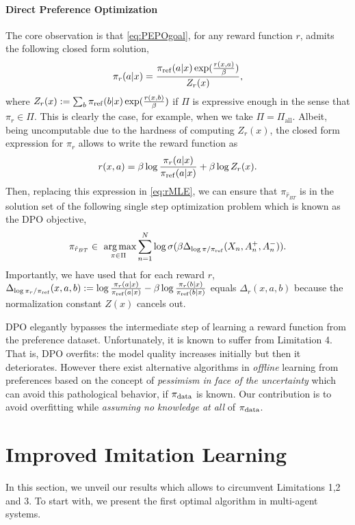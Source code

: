 \documentclass{article}
\begin{document}
\paragraph{Direct Preference Optimization}
The core observation is that \eqref{eq:PEPOgoal}, for any reward function $r$, admits the following closed form solution, 
\begin{equation}
\label{eq:Optimal-Policy}
\pi_r(a|x) = \frac{\pi_{\mathrm{ref}}(a|x) \exp(\frac{r(x,a)}{\beta})}{Z_r(x)},
\end{equation}
where $ Z_r(x) := \sum_{b} \pi_{\mathrm{ref}}(b|x) \exp(\frac{r(x,b)}{\beta})$ if $\Pi$ is expressive enough in the sense that $\pi_r \in \Pi$. This is clearly the case, for example, when we take $\Pi=\Pi_{\mathrm{all}}$. Albeit, being uncomputable due to the hardness of computing  $Z_r(x)$, the closed form expression for $\pi_r$ allows to write the reward function as \begin{equation}r(x,a) = \beta \log \frac{\pi_r(a|x)}{\pi_{\mathrm{ref}}(a|x)} + \beta \log Z_r(x) \label{eq:rfrompi}.\end{equation} Then, replacing this expression in \eqref{eq:rMLE}, we can ensure that $\pi_{\hat{r}_{BT}}$ is in the solution set of the following single step optimization problem which is known as the DPO objective,
\begin{equation}
\label{eq:DPO}
    \pi_{\hat{r}_{BT}} \in \mathop{\mbox{ arg\,max}}_{\pi \in \Pi} \sum^N_{n=1} \log \sigma (\beta \Delta_{\log \pi/\pi_{\mathrm{ref}}}(X_n, A^+_n, A^-_n)).
\end{equation}
Importantly, we have used that for each reward $r$,  $ \Delta_{\log \pi_r/\pi_{\mathrm{ref}}}(x,a,b) :=  \log \frac{\pi_r(a|x)}{\pi_{\mathrm{ref}}(a|x)} - \beta \log \frac{\pi_r(b|x)}{\pi_{\mathrm{ref}}(b|x)} $ equals $\Delta_r(x,a,b)$ because the normalization constant $Z(x)$ cancels out.

DPO elegantly bypasses the intermediate step of learning a reward function from the preference dataset. Unfortunately, it is known to suffer from Limitation 4. That is, DPO overfits: the model quality increases initially but then it deteriorates. However there exist alternative algorithms \citep{huang2024correcting,liu2024provably} in \emph{offline} learning from preferences based on the concept of \emph{pessimism in face of the uncertainty}  which can avoid this pathological behavior, if $\pi_{\mathrm{data}}$ is known.
Our contribution is to avoid overfitting while \emph{assuming no knowledge at all} of $\pi_{\mathrm{data}}$.

\section{Improved Imitation Learning}
In this section, we unveil our results which allows to circumvent Limitations 1,2 and 3.
To start with, we present the first optimal algorithm in multi-agent systems.
\end{document}
